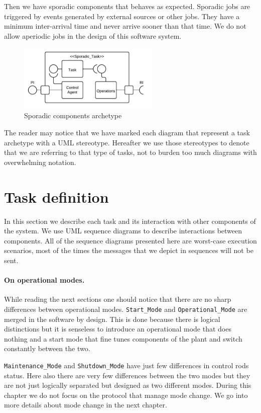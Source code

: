 \documentclass[10pt,a4paper]{report}
\begin{document}
Then we have sporadic components that behaves as expected. Sporadic jobs are 
triggered by events generated by external sources or other jobs. They have a 
minimum inter-arrival time and never arrive sooner than that time. We do not
allow aperiodic jobs in the design of this software system.
\begin{figure}[htb]
\includegraphics[width=0.6\textwidth]{diagrams/Sporadic_Components}
\centering
\caption{Sporadic components archetype}
\end{figure}
The reader may notice that we have marked each diagram that represent a task 
archetype with a UML stereotype. Hereafter we use those stereotypes to denote 
that we are referring to that type of tasks, not to burden too much diagrams 
with overwhelming notation. 


\section{Task definition}
In this section we describe each task and its interaction with other 
components of the system. We use UML sequence diagrams to describe 
interactions between components. All of the sequence diagrams presented here are 
worst-case execution scenarios, most of the times the messages that we depict in
sequences will not be sent. 

\paragraph{On operational modes. }
While reading the next sections one should notice that there are no sharp 
differences between operational modes. \texttt{Start\_Mode} and 
\texttt{Operational\_Mode} are merged in the software by design. This is done 
because there is logical distinctions but it is senseless to introduce an 
operational mode that does nothing and a start mode that fine tunes components of 
the plant and switch constantly between the two.

\texttt{Maintenance\_Mode} and \texttt{Shutdown\_Mode} have just few differences
in control rods status. Here also there are very few differences between the two
modes but they are not just logically separated but designed as two different 
modes. During this chapter we do not focus on the protocol that manage mode 
change. We go into more details about mode change in the next chapter.
\end{document}
